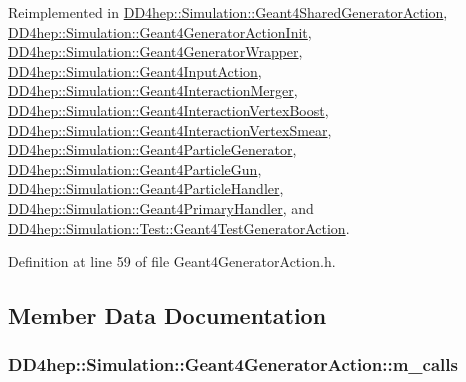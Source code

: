Reimplemented in \hyperlink{class_d_d4hep_1_1_simulation_1_1_geant4_shared_generator_action_a21ff9d287af96c7bb0a3cf8975cac070}{DD4hep::Simulation::Geant4SharedGeneratorAction}, \hyperlink{class_d_d4hep_1_1_simulation_1_1_geant4_generator_action_init_adbcf087dfc4c0ac510b102dfd1f838b0}{DD4hep::Simulation::Geant4GeneratorActionInit}, \hyperlink{class_d_d4hep_1_1_simulation_1_1_geant4_generator_wrapper_a073ee3177fe624c0caf2bb5068d9d865}{DD4hep::Simulation::Geant4GeneratorWrapper}, \hyperlink{class_d_d4hep_1_1_simulation_1_1_geant4_input_action_abda8423a68e04eec20eb52c01883c0ba}{DD4hep::Simulation::Geant4InputAction}, \hyperlink{class_d_d4hep_1_1_simulation_1_1_geant4_interaction_merger_a5af2cee708859468f78130560ffa4a6e}{DD4hep::Simulation::Geant4InteractionMerger}, \hyperlink{class_d_d4hep_1_1_simulation_1_1_geant4_interaction_vertex_boost_ab66ab43b06523e720a1e377ecd065a66}{DD4hep::Simulation::Geant4InteractionVertexBoost}, \hyperlink{class_d_d4hep_1_1_simulation_1_1_geant4_interaction_vertex_smear_ada2914ca2a761ff0e1ccbbcc8bef578e}{DD4hep::Simulation::Geant4InteractionVertexSmear}, \hyperlink{class_d_d4hep_1_1_simulation_1_1_geant4_particle_generator_a4b7c8fdbc6fdc0c79efdf112c8ede315}{DD4hep::Simulation::Geant4ParticleGenerator}, \hyperlink{class_d_d4hep_1_1_simulation_1_1_geant4_particle_gun_a4e68905424d21f2386d24d3cbaf795f1}{DD4hep::Simulation::Geant4ParticleGun}, \hyperlink{class_d_d4hep_1_1_simulation_1_1_geant4_particle_handler_a239e9338d41588f5dcfc3ea012aba02a}{DD4hep::Simulation::Geant4ParticleHandler}, \hyperlink{class_d_d4hep_1_1_simulation_1_1_geant4_primary_handler_a54370e4749de14a101a248981f51864b}{DD4hep::Simulation::Geant4PrimaryHandler}, and \hyperlink{class_d_d4hep_1_1_simulation_1_1_test_1_1_geant4_test_generator_action_af50b716c4764ffa0bf42c4b01ee3d394}{DD4hep::Simulation::Test::Geant4TestGeneratorAction}.

Definition at line 59 of file Geant4GeneratorAction.h.

\subsection{Member Data Documentation}
\hypertarget{class_d_d4hep_1_1_simulation_1_1_geant4_generator_action_aa0b8787cbdd5dfefc992aac6dd1073c3}{
\subsubsection[{m\_\-calls}]{ {\bf DD4hep::Simulation::Geant4GeneratorAction::m\_\-calls}}}
\label{class_d_d4hep_1_1_simulation_1_1_geant4_generator_action_aa0b8787cbdd5dfefc992aac6dd1073c3}



